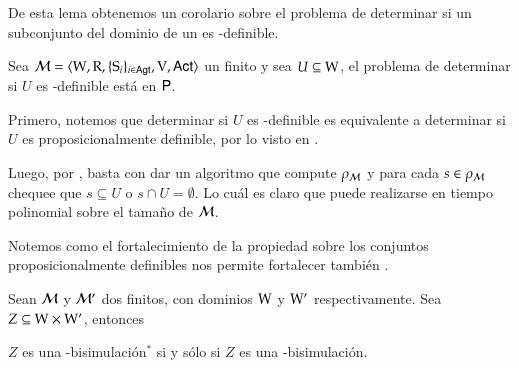 De esta lema obtenemos un corolario sobre el problema de determinar si un subconjunto del dominio de un \ults es \KHilogic-definible.

\begin{corolario}
    Sea $\mathcal{M}=\langle \mathrm{W},\mathrm{R},\{ \mathrm{S}_i \}_{i \in {\rm \sf Agt}},\mathrm{V},{\rm \sf Act} \rangle$ un \ults finito y sea $U \subseteq \mathrm{W}$, el problema de determinar si $U$ es 
    \KHilogic-definible está en $\rm\textsf{P}$.
\end{corolario}

\begin{demostracion}

    Primero, notemos que determinar si $U$ es \KHilogic-definible es equivalente a determinar si $U$ es proposicionalmente definible, por lo visto en 
    .

    Luego, por , basta con dar un algoritmo que compute $\rho_{\mathcal{M}}$ y para cada $s \in \rho_{\mathcal{M}}$ 
    chequee que $s \subseteq U$ o $s \cap U = \emptyset$. Lo cuál es claro que puede realizarse en tiempo polinomial sobre el tamaño de $\mathcal{M}$.
\end{demostracion}

Notemos como el fortalecimiento de la propiedad sobre los conjuntos proposicionalmente definibles nos permite fortalecer también .

\begin{lema}\label{lema:finite-old_bisim-implies-new_bisim}
    Sean $\mathcal{M}$ y $\mathcal{M}'$ dos \ultss finitos, con dominios $\mathrm{W}$ y $\mathrm{W}'$ respectivamente. Sea $Z \subseteq \mathrm{W} \times \mathrm{W}'$, entonces 
    \begin{center}
        $Z$ es una \KHilogic-bisimulación$^*$ si y sólo si $Z$ es una \KHilogic-bisimulación.
    \end{center}
\end{lema}

